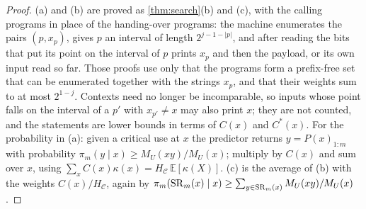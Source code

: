 \begin{proof}
(a) and (b) are proved as \cref{thm:search}(b) and (c), with the calling programs in place of the
handing-over programs: the machine enumerates the pairs $(p,x_p)$, gives $p$ an interval of length
$2^{j-1-|p|}$, and after reading the bits that put its point on the interval of $p$ prints $x_p$ and then the
payload, or its own input read so far. Those proofs use only that the programs form a prefix-free set that
can be enumerated together with the strings $x_p$, and that their weights sum to at most $2^{1-j}$. Contexts
need no longer be incomparable, so inputs whose point falls on the interval of a $p'$ with $x_{p'}\ne x$ may
also print $x$; they are not counted, and the statements are lower bounds in terms of $C(x)$ and $C^*(x)$. For
the probability in (a): given a critical use at $x$ the predictor returns $y=P(x)_{1:m}$ with probability
$\pi_m(y\mid x)\ge M_U(xy)/M_U(x)$; multiply by $C(x)$ and sum over $x$, using $\sum_xC(x)\kappa(x)=H_{\mathcal
C}\,\mathbb E[\kappa(X)]$. (c) is the average of (b) with the weights $C(x)/H_{\mathcal C}$, again by
$\pi_m(\mathrm{SR}_m(x)\mid x)\ge\sum_{y\in\mathrm{SR}_m(x)}M_U(xy)/M_U(x)$.
\end{proof}

